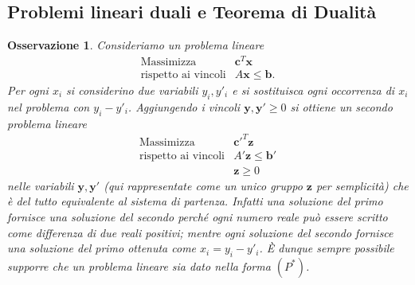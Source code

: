 \documentclass[italian, 12pt, reqno]{article}
\theoremstyle{myteo}
\newtheorem{remark}[theorem]{Osservazione}
\numberwithin{equation}{section}
\begin{document}
\subsection{Problemi lineari duali e Teorema di Dualità}
\label{subsec:duali}
\begin{remark}
  \label{oss:forma_quasi_equazionale}
  Consideriamo un problema lineare
  \begin{equation*}
    \begin{array}{ll}
      \tag{\(P\)}
      \text{Massimizza} & \mathbf{c}^T\mathbf{x}\\
      \text{rispetto ai vincoli} & A\mathbf{x}\leq\mathbf{b}.
    \end{array}
  \end{equation*}
  Per ogni \(x_i\) si considerino due variabili \(y_i, y'_i\) e si sostituisca ogni occorrenza di \(x_i\) nel problema con \(y_i - y'_i\).
  Aggiungendo i vincoli \(\mathbf{y},\mathbf{y'}\geq0\) si ottiene un secondo problema lineare
  \begin{equation*}
    \begin{array}{ll}
      \tag{\(P^*\)}
      \text{Massimizza} & \mathbf{c'}^T\mathbf{z}\\
      \text{rispetto ai vincoli} & A'\mathbf{z}\leq\mathbf{b'}\\
                        & \mathbf{z}\geq0
    \end{array}
  \end{equation*}
  nelle variabili \(\mathbf{y}, \mathbf{y'}\) (qui rappresentate come un unico gruppo \(\mathbf{z}\) per semplicità) che è del tutto equivalente al sistema di partenza.
  Infatti una soluzione del primo fornisce una soluzione del secondo perché ogni numero reale può essere scritto come differenza di due reali positivi; mentre ogni soluzione del secondo fornisce una soluzione del primo ottenuta come \(x_i = y_i-y'_i\).
  È dunque sempre possibile supporre che un problema lineare sia dato nella forma \((P^*)\).
\end{remark}
\end{document}
